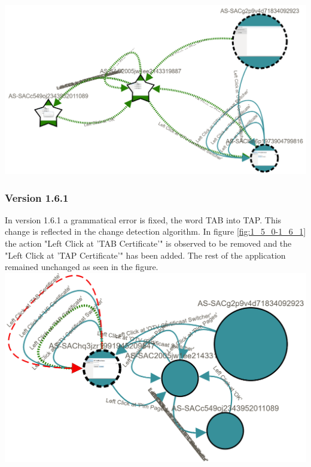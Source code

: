 \begingroup
\captionsetup{type=figure}
\includegraphics[scale=0.4]{images/6-Experiment/1_0_0-1_5_0.png}
\label{fig:1_0_0-1_5_0}
\endgroup

\subsubsection{Version 1.6.1}
In version 1.6.1 a grammatical error is fixed, the word TAB into TAP. This change is reflected in the change detection algorithm. In figure \ref{fig:1_5_0-1_6_1} the action "Left Click at 'TAB Certificate'" is observed to be removed and the "Left Click at 'TAP Certificate'" has been added. The rest of the application remained unchanged as seen in the figure. \\
\begingroup
\captionsetup{type=figure}
\includegraphics[scale=0.5]{images/6-Experiment/1_5_0-1_6_1.png}
\label{fig:1_5_0-1_6_1}
\endgroup

